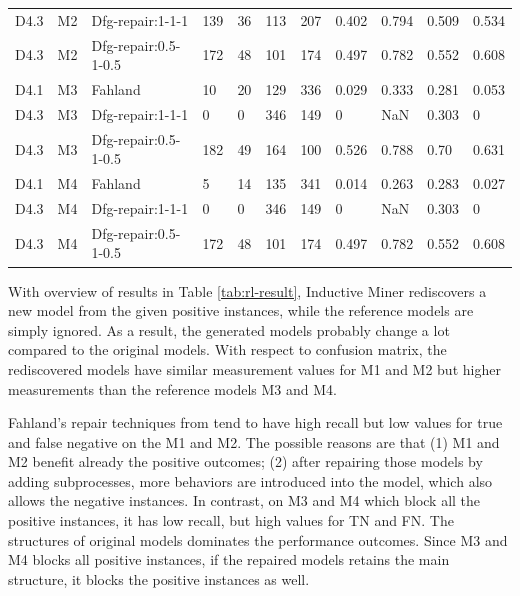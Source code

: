 \begin{table}[ht]
{\begin{tabular}{lll|llllllll|}
			D4.3      & M2              & Dfg-repair:1-1-1     &  139   & 36   & 113    &   207  &   0.402     &   0.794        &   0.509       &   0.534              \\
			D4.3      & M2              & Dfg-repair:0.5-1-0.5     &  172   & 48   & 101    &   174  &   0.497     &   0.782        &   0.552       &   0.608              \\
			\hline
			D4.1      & M3              & Fahland   & 10    &  20  & 129    &  336   & 0.029       &    0.333       &  0.281        &  0.053                    \\
			D4.3      & M3              & Dfg-repair:1-1-1       &  0   &  0  & 346    &  149   &  0      &   NaN        &   0.303       &  0       \\ 
			D4.3      & M3              & Dfg-repair:0.5-1-0.5       &  182   &  49  & 164    &  100   &  0.526      &   0.788        &   0.70       &  0.631      \\ 
			
			\hline
			D4.1      & M4              & Fahland   & 5    &  14  & 135    &  341   & 0.014      &    0.263      &  0.283        &  0.027                 \\
			
			D4.3      & M4              & Dfg-repair:1-1-1       &   0  & 0   &  346   & 149    &   0     &    NaN       &     0.303     &  0      \\  
			D4.3      & M4              & Dfg-repair:0.5-1-0.5       &   172  & 48   &  101   & 174    &   0.497     &    0.782       &     0.552     &  0.608      \\      
			\hline              
	\end{tabular}}
\end{table}

With overview of results in Table \ref{tab:rl-result}, Inductive Miner rediscovers a new model from the given positive instances, while the reference models are simply ignored. As a result, the generated models probably change a lot compared to the original models. With respect to confusion matrix, the rediscovered models have similar measurement values for M1 and M2 but higher measurements than the reference models M3 and M4.


Fahland's repair techniques from \cite{fahland2015model} tend to have high recall but low values for true and false negative on the M1 and M2. The possible reasons are that  (1) M1 and M2 benefit already the positive outcomes;  (2) after repairing those models  by adding subprocesses, more behaviors  are introduced into the model, which also allows the negative instances.   In contrast, on M3 and M4 which block all the positive instances, it has low recall, but high values for TN and FN. The structures of original models dominates the performance outcomes. Since M3 and M4 blocks all positive instances, if the repaired models retains the main structure, it  blocks the positive instances as well. 


